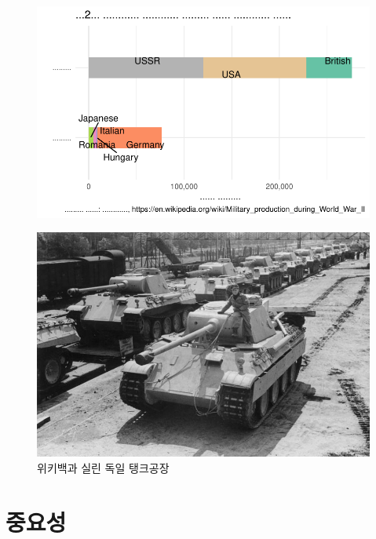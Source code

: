\documentclass[
  letterpaper,
  chapter,a4paper,showtrims,openright,hidelinks]{oblivoir}
\begin{document}
\begin{figure}[H]

{\centering \includegraphics{cs_german_tank_files/figure-pdf/unnamed-chunk-3-1.pdf}

}

\end{figure}

\begin{figure}

{\centering \includegraphics{images/german_tank.jpg}

}

\caption{위키백과 실린 독일 탱크공장}

\end{figure}

\hypertarget{uxc911uxc694uxc131}{%
\section{중요성}\label{uxc911uxc694uxc131}}
\end{document}
